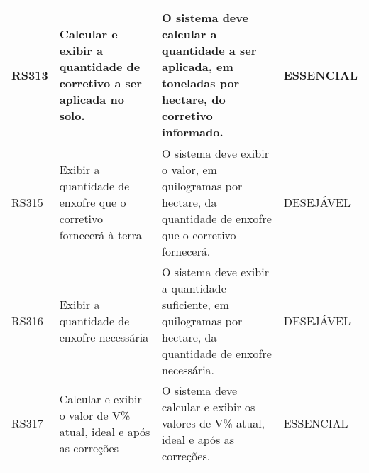 \begin{table}
\begin{tabular}{|p{2cm}|p{4cm}|p{6cm}|p{2cm}|}
\hline
RS313 & Calcular e exibir a quantidade de corretivo a ser aplicada no solo.              & O sistema deve calcular a quantidade a ser aplicada, em toneladas por hectare, do corretivo informado.                                                                                                                                                                                         & ESSENCIAL   \\ 
\hline
RS315 & Exibir a quantidade de enxofre que o corretivo fornecerá à terra                 & O sistema deve exibir o valor, em quilogramas por hectare, da quantidade de enxofre que o corretivo fornecerá.                                                                                                                                                                                 & DESEJÁVEL   \\ 
\hline
RS316 & Exibir a quantidade de enxofre necessária                                        & O sistema deve exibir a quantidade suficiente, em quilogramas por hectare, da quantidade de enxofre necessária.                                                                                                                                                                                & DESEJÁVEL   \\ 
\hline
RS317 & Calcular e exibir o valor de V\% atual, ideal e após as correções                & O sistema deve calcular e exibir os valores de V\% atual, ideal e após as correções.                                                                                                                                                                                                           & ESSENCIAL   \\
\bottomrule
\end{tabular}
\end{table}